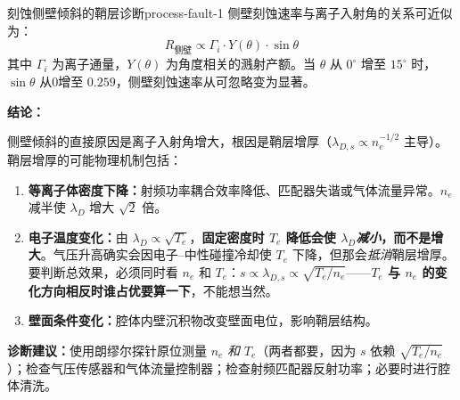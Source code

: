 \documentclass[12pt,a4paper,openany,oneside]{book}
\begin{document}
\begin{example}{刻蚀侧壁倾斜的鞘层诊断}{process-fault-1}
侧壁刻蚀速率与离子入射角的关系可近似为：
\[
R_{\text{侧壁}} \propto \Gamma_i \cdot Y(\theta) \cdot \sin\theta
\]
其中 $\Gamma_i$ 为离子通量，$Y(\theta)$ 为角度相关的溅射产额。当 $\theta$ 从 $0^\circ$ 增至 $15^\circ$ 时，$\sin\theta$ 从0增至 $0.259$，侧壁刻蚀速率从可忽略变为显著。

\textbf{结论：}

侧壁倾斜的直接原因是离子入射角增大，根因是鞘层增厚（$\lambda_{D,s}\propto n_e^{-1/2}$ 主导）。鞘层增厚的可能物理机制包括：
\begin{enumerate}
    \item \textbf{等离子体密度下降：}射频功率耦合效率降低、匹配器失谐或气体流量异常。$n_e$ 减半使 $\lambda_D$ 增大 $\sqrt2$ 倍。
    \item \textbf{电子温度变化：}由 $\lambda_D\propto\sqrt{T_e}$，\textbf{固定密度时 $T_e$ 降低会使 $\lambda_D$\emph{减小}，而不是增大}。气压升高确实会因电子--中性碰撞冷却使 $T_e$ 下降，但那会\emph{抵消}鞘层增厚。要判断总效果，必须同时看 $n_e$ 和 $T_e$：$s\propto\lambda_{D,s}\propto\sqrt{T_e/n_e}$——\textbf{$T_e$ 与 $n_e$ 的变化方向相反时谁占优要算一下}，不能想当然。
    \item \textbf{壁面条件变化：}腔体内壁沉积物改变壁面电位，影响鞘层结构。
\end{enumerate}

\textbf{诊断建议：}使用朗缪尔探针原位测量 $n_e$ \emph{和} $T_e$（两者都要，因为 $s$ 依赖 $\sqrt{T_e/n_e}$）；检查气压传感器和气体流量控制器；检查射频匹配器反射功率；必要时进行腔体清洗。
\end{example}
\end{document}
